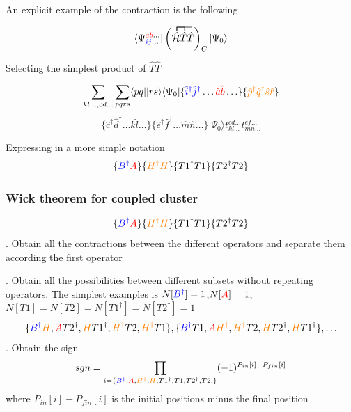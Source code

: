 \documentclass{beamer}
\begin{document}
\begin{frame}
An explicit example of the contraction is the following

\[
\langle \Psi^{\textcolor{red}{ab}\ldots}_{\textcolor{blue}{ij}\ldots} |  \left(
\contraction{}{ \bar{11}}{}{\bar{1}} 
    \contraction{} { \bar{11}}{1}{ {\hat{11}}} 
 \hat{\mathcal{H}} \hat{T} \hat{T} 
\right)_{C}| \Psi_{0} \rangle
\]

Selecting the simplest product of $\hat{T}\hat{T}$ 

\begin{footnotesize}
\[
 \sum_{kl\ldots,cd \ldots}\sum_{pqrs} \langle pq||rs \rangle \langle \Psi_{0} |\{ \textcolor{blue}{\hat{i}^{\dagger}} \textcolor{blue}{\hat{j}^{\dagger}} \ldots \textcolor{red}{\hat{a}} \textcolor{red}{\hat{b}} \ldots \} \{\textcolor{orange}{\hat{p}^{\dagger}\hat{q}^{\dagger}\hat{s}\hat{r}} \}
 \]
 \[
 \{\hat{c}^{\dagger}\hat{d}^{\dagger} \ldots \hat{k}\hat{l} \ldots \} \{ \hat{e}^{\dagger}\hat{f}^{\dagger} \ldots \hat{m}\hat{n}\ldots  \}| \Psi_{0} \rangle t_{kl \ldots}^{cd \ldots}t_{mn \ldots}^{ef \ldots}
\]
\end{footnotesize}

Expressing in a more simple notation
\[
\{
\textcolor{blue}{B^{\dagger}}\textcolor{red}{A}
\}
\{
\textcolor{orange}{H^{\dagger}}\textcolor{orange}{H}
\}
\{
T1^{\dagger}
T1
\}
\{
T2^{\dagger}
T2
\}
\]

\end{frame}



\begin{frame}
\frametitle{Wick theorem for coupled cluster}

\begin{footnotesize}
\begin{algorithmic}
\Require
\[
\{
\textcolor{blue}{B^{\dagger}}\textcolor{red}{A}
\}
\{
\textcolor{orange}{H^{\dagger}}\textcolor{orange}{H}
\}
\{
T1^{\dagger}
T1
\}
\{
T2^{\dagger}
T2
\}
\]
.
Obtain all the contractions between the different operators and separate them according the first operator

 
. Obtain all the possibilities between different subsets without repeating  operators. The simplest examples is $N[\textcolor{blue}{B^{\dagger}}]=1$,$N[\textcolor{red}{A}]=1$, $N[T1]=N[T2]=N[T1^{\dagger}]=N[T2^{\dagger}]
=1$
\[
\{
\textcolor{blue}{B^{\dagger}}
\textcolor{orange}{H},
\textcolor{red}{A}
T2^{\dagger},
\textcolor{orange}{H}
T1^{\dagger},
\textcolor{orange}{H^{\dagger}}
T2,
\textcolor{orange}{H^{\dagger}}
T1
\},
\{
\textcolor{blue}{B^{\dagger}}
T1,
\textcolor{red}{A}
\textcolor{orange}{H^{\dagger}},
\textcolor{orange}{H^{\dagger}}
T2,
\textcolor{orange}{H}
T2^{\dagger},
\textcolor{orange}{H}
T1^{\dagger}
\},\ldots
\]
. Obtain the sign
\[
sgn= \prod_{i=\{
\textcolor{blue}{B^{\dagger}},\textcolor{red}{A},
\textcolor{orange}{H^{\dagger}},\textcolor{orange}{H},
T1^{\dagger},
T1,
T2^{\dagger},
T2,
\}}(-1)^{P_{in}[i]-P_{fin}[i]}
\]
where $P_{in}[i]-P_{fin}[i]$ is the initial positions minus the final position
\end{algorithmic}
\end{footnotesize}
\end{frame}
\end{document}
